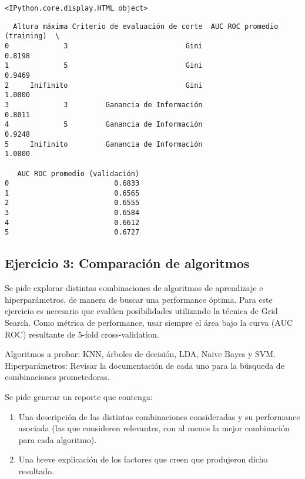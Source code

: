 \documentclass[11pt]{article}
\begin{document}
    
    \begin{verbatim}
<IPython.core.display.HTML object>
    \end{verbatim}

    
    
    \begin{verbatim}
  Altura máxima Criterio de evaluación de corte  AUC ROC promedio (training)  \
0             3                            Gini                       0.8198   
1             5                            Gini                       0.9469   
2     Inifinito                            Gini                       1.0000   
3             3         Ganancia de Información                       0.8011   
4             5         Ganancia de Información                       0.9248   
5     Inifinito         Ganancia de Información                       1.0000   

   AUC ROC promedio (validación)  
0                         0.6833  
1                         0.6565  
2                         0.6555  
3                         0.6584  
4                         0.6612  
5                         0.6727  
    \end{verbatim}

    
    \subsection{Ejercicio 3: Comparación de
algoritmos}\label{ejercicio-3-comparaciuxf3n-de-algoritmos}

Se pide explorar distintas combinaciones de algoritmos de aprendizaje e
hiperparámetros, de manera de buscar una performance óptima. Para este
ejercicio es necesario que evalúen posibilidades utilizando la técnica
de Grid Search. Como métrica de performance, usar siempre el área bajo
la curva (AUC ROC) resultante de 5-fold cross-validation.

Algoritmos a probar: KNN, árboles de decisión, LDA, Naive Bayes y SVM.
Hiperparámetros: Revisar la documentación de cada uno para la búsqueda
de combinaciones prometedoras.

Se pide generar un reporte que contenga:

\begin{enumerate}
\def\labelenumi{\arabic{enumi}.}
\item
  Una descripción de las distintas combinaciones consideradas y su
  performance asociada (las que consideren relevantes, con al menos la
  mejor combinación para cada algoritmo).
\item
  Una breve explicación de los factores que creen que produjeron dicho
  resultado.
\end{enumerate}
\end{document}
